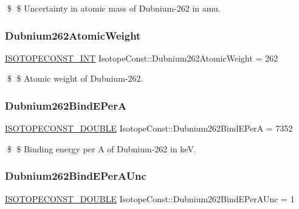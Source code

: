 \$ \$ Uncertainty in atomic mass of Dubnium-\/262 in amu. \mbox{\label{group___isotope_const-_dubnium-_db262_gab8bb7eea792595e2babeb3b3755ff74f}} 
\subsubsection{\texorpdfstring{Dubnium262\+Atomic\+Weight}{Dubnium262AtomicWeight}}
{\footnotesize\ttfamily \mbox{\hyperlink{group___isotope_const-_macros_ga5f18360b3e99483a35c32d789e62621c}{I\+S\+O\+T\+O\+P\+E\+C\+O\+N\+S\+T\+\_\+\+I\+NT}} Isotope\+Const\+::\+Dubnium262\+Atomic\+Weight = 262}

\$ \$ Atomic weight of Dubnium-\/262. \mbox{\label{group___isotope_const-_dubnium-_db262_ga0ffdc87b622d6f8844ae820ef38aea59}} 
\subsubsection{\texorpdfstring{Dubnium262\+Bind\+E\+PerA}{Dubnium262BindEPerA}}
{\footnotesize\ttfamily \mbox{\hyperlink{group___isotope_const-_macros_ga8f45a7272ce02c0b4c65c44636ed719a}{I\+S\+O\+T\+O\+P\+E\+C\+O\+N\+S\+T\+\_\+\+D\+O\+U\+B\+LE}} Isotope\+Const\+::\+Dubnium262\+Bind\+E\+PerA = 7352}

\$ \$ Binding energy per A of Dubnium-\/262 in keV. \mbox{\label{group___isotope_const-_dubnium-_db262_gab672a1f5877a8595ac74e2e0cb3c77af}} 
\subsubsection{\texorpdfstring{Dubnium262\+Bind\+E\+Per\+A\+Unc}{Dubnium262BindEPerAUnc}}
{\footnotesize\ttfamily \mbox{\hyperlink{group___isotope_const-_macros_ga8f45a7272ce02c0b4c65c44636ed719a}{I\+S\+O\+T\+O\+P\+E\+C\+O\+N\+S\+T\+\_\+\+D\+O\+U\+B\+LE}} Isotope\+Const\+::\+Dubnium262\+Bind\+E\+Per\+A\+Unc = 1}


